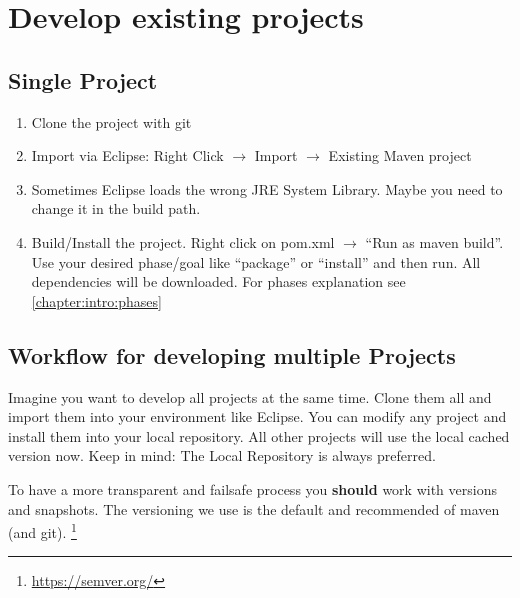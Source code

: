 \section{Develop existing projects}

\subsection{Single Project}
\begin{enumerate}
	\item Clone the project with git
	\item Import via Eclipse: Right Click $\rightarrow$ Import $\rightarrow$ Existing Maven project
	\item Sometimes Eclipse loads the wrong JRE System Library. Maybe you need to change it in the build path.
	\item  Build/Install the project. Right click on pom.xml $\rightarrow$ “Run as maven build”. Use your desired phase/goal like “package” or “install” and then run. All dependencies will be downloaded. For phases explanation see \ref{chapter:intro:phases}
\end{enumerate}


\subsection[Multiple Projects]{Workflow for developing multiple Projects}
Imagine you want to develop all projects at the same time. Clone them all and import them into your environment like Eclipse. You can modify any project and install them into your local repository. All other projects will use the local cached version now. Keep in mind: The Local Repository is always preferred. 

To have a more transparent and failsafe process you \textbf{should} work with versions and snapshots. The versioning we use is the default and recommended of maven (and git). \footnote{\url{https://semver.org/}}
 
